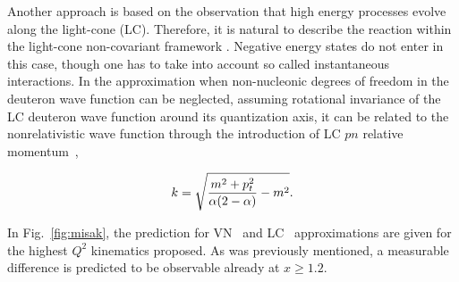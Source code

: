 Another approach is based on the observation that high energy processes
evolve along the light-cone (LC).  Therefore, it is natural to describe the 
reaction within the light-cone non-covariant framework \cite{Frankfurt:1981mk}. 
Negative energy states do not enter in this case, though one has to take into 
account so called instantaneous interactions.
In the approximation when non-nucleonic degrees of freedom in the
deuteron wave function can be neglected, assuming rotational invariance of the LC deuteron wave function around its quantization axis, it can be related to the nonrelativistic wave function through the introduction of LC $pn$ relative momentum~\cite{Frankfurt:1981mk, Miller:2009fc},

\begin{equation}
k=\sqrt{{m^2+p_t^2\over \alpha(2-\alpha)} - m^2}.
\end{equation}

In Fig.~\ref{fig:misak}, the prediction for VN~\cite{Sargsian:2009hf} and LC~\cite{Frankfurt:1993sp} approximations are given 
for the highest $Q^2$ kinematics proposed. As was previously mentioned, a measurable 
difference is predicted to be observable already at $x\ge 1.2$.
 
 


